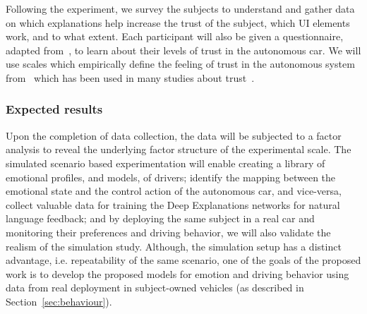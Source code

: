 Following the experiment, we survey the subjects to understand and gather data on which explanations help increase the trust of the subject, which UI elements work, and to what extent.
Each participant will also be given a questionnaire, adapted from~\cite{merritt2013trust}, to learn about their levels of trust in the autonomous car. 
We will use scales which empirically define the feeling of trust in the autonomous system from~\cite{jian2000foundations} which has been used in many studies about trust~\cite{hoff2015trust}.
\vspace{-5pt}
\subsubsection{Expected results} 
Upon the completion of data collection, the data will be subjected to a factor analysis to reveal the underlying factor structure of the experimental scale. 
The simulated scenario based experimentation will enable creating a library of emotional profiles, and models, of drivers; identify the mapping between the emotional state and the control action of the autonomous car, and vice-versa, collect valuable data for training the Deep Explanations networks for natural language feedback; and by deploying the same subject in a real car and monitoring their preferences and driving behavior, we will also validate the realism of the simulation study. 
Although, the simulation setup has a distinct advantage, i.e. repeatability of the same scenario, one of the goals of the proposed work is to develop the proposed models for emotion and driving behavior using data from real deployment in subject-owned vehicles (as described in Section~\ref{sec:behaviour}). 


